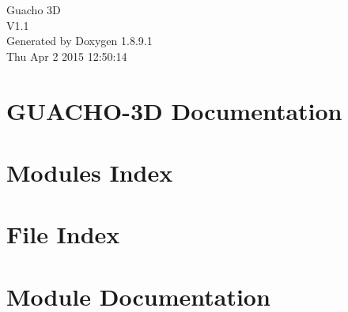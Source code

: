 \documentclass[twoside]{book}
\newcommand{\+}{\discretionary{\mbox{\scriptsize$\hookleftarrow$}}{}{}}
\newcommand{\clearemptydoublepage}{%
  \newpage{\pagestyle{empty}\cleardoublepage}%
}
\begin{document}
\hypersetup{pageanchor=false,
             bookmarks=true,
             bookmarksnumbered=true,
             pdfencoding=unicode
            }
\begin{titlepage}
\vspace*{7cm}
\begin{center}%
{\Large Guacho 3\+D \\[1ex]\large V1.\+1 }\\
\vspace*{1cm}
{\large Generated by Doxygen 1.8.9.1}\\
\vspace*{0.5cm}
{\small Thu Apr 2 2015 12:50:14}\\
\end{center}
\end{titlepage}
\clearemptydoublepage
\tableofcontents
\clearemptydoublepage
{}
\hypersetup{pageanchor=true}

\chapter{G\+U\+A\+C\+H\+O-\/3\+D Documentation}
\label{index}\hypertarget{index}{}
\chapter{Modules Index}

\chapter{File Index}

\chapter{Module Documentation}
























\end{document}

